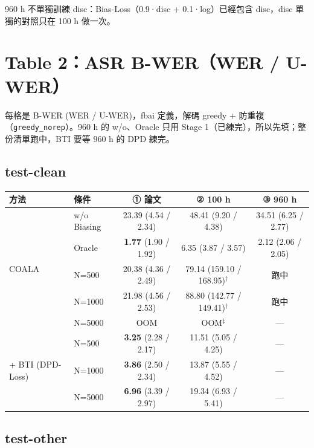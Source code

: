 \documentclass[11pt,a4paper]{article}
\newcommand{\todo}{---}                 %
\newcommand{\running}{跑中}
\begin{document}
{\small 960 h 不單獨訓練 disc：Bias-Loss（0.9·disc + 0.1·log）已經包含 disc，disc 單獨的對照只在 100 h 做一次。\par}

\section*{Table 2：ASR B-WER（WER / U-WER）}

每格是 B-WER (WER / U-WER)，fbai 定義，解碼 greedy + 防重複（\texttt{greedy\_norep}）。960 h 的 w/o、Oracle 只用 Stage 1（已練完），所以先填；整份清單跑中，BTI 要等 960 h 的 DPD 練完。

\subsection*{test-clean}

\begin{center}
{\small
\begin{tabular}{llccc}
\toprule
\textbf{方法} & \textbf{條件} & \textbf{① 論文} & \textbf{② 100 h} & \textbf{③ 960 h} \\
\midrule
\multirow{5}{*}{COALA}
 & w/o Biasing & 23.39 (4.54 / 2.34) & 48.41 (9.20 / 4.38) & 34.51 (6.25 / 2.77) \\
 & Oracle      & \textbf{1.77} (1.90 / 1.92) & 6.35 (3.87 / 3.57) & 2.12 (2.06 / 2.05) \\
 & N=500       & 20.38 (4.36 / 2.49) & 79.14 (159.10 / 168.95)$^\dagger$ & \running \\
 & N=1000      & 21.98 (4.56 / 2.53) & 88.80 (142.77 / 149.41)$^\dagger$ & \running \\
 & N=5000      & OOM & OOM$^\ddagger$ & \todo \\
\midrule
\multirow{3}{*}{+ BTI (DPD-Loss)}
 & N=500       & \textbf{3.25} (2.28 / 2.17) & 11.51 (5.05 / 4.25) & \todo \\
 & N=1000      & \textbf{3.86} (2.50 / 2.34) & 13.87 (5.55 / 4.52) & \todo \\
 & N=5000      & \textbf{6.96} (3.39 / 2.97) & 19.34 (6.93 / 5.41) & \todo \\
\bottomrule
\end{tabular}
}
\end{center}

\subsection*{test-other}
\end{document}
